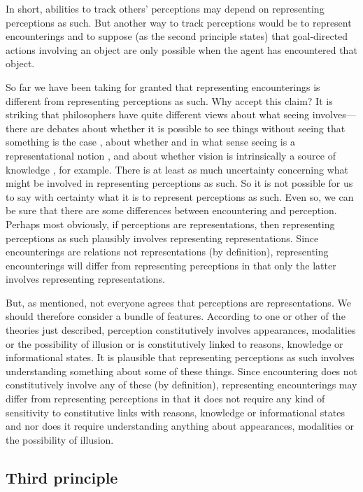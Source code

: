 \documentclass[12pt,\papersize]{extarticle}
\begin{document}
In short, 
abilities to track others' perceptions  may depend on representing perceptions as such.
But another way to track perceptions would be to represent encounterings and to suppose (as the second principle states) that goal-directed actions involving an object are only possible when the agent has encountered that object.


So far we have been taking for granted that representing encounterings is different from representing perceptions as such.
Why accept this claim? 
It is striking that philosophers have quite different views about what seeing involves—there are debates about whether it is possible to see things without seeing that something is the case \citep[e.g.][]{en_1671}, about whether and in what sense seeing is a representational notion \citep[]{en_1619, en_1705}, and about whether vision is intrinsically a source of knowledge \citep[]{en_1706}, for example.  
There is at least as much uncertainty concerning what might be involved in representing perceptions as such. 
So it is not possible for us to say with certainty what it is to represent perceptions as such.  
Even so, we can be sure that there are some differences between encountering and perception.
Perhaps most obviously, if perceptions are representations, then representing perceptions as such plausibly involves representing representations.
Since encounterings are relations not representations (by definition), representing encounterings will  differ from representing perceptions in that only the latter involves representing representations.


But, as mentioned, not everyone agrees that perceptions are representations.
We should therefore consider a bundle of features.
According to one or other of the theories just described, perception constitutively involves appearances, modalities or the possibility of illusion or is constitutively linked to reasons, knowledge or informational states.
It is plausible that representing perceptions as such involves understanding something about some of these things.
Since encountering does not constitutively involve any of these (by definition), 
representing encounterings may differ from representing perceptions in that it does not require any kind of sensitivity to constitutive links with reasons, knowledge or informational states and nor does it require understanding  anything about appearances, modalities or the possibility of illusion.



\subsection{Third principle}
\end{document}
